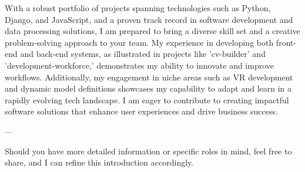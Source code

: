 
        With a robust portfolio of projects spanning technologies such as Python, Django, and JavaScript, and a proven track record in software development and data processing solutions, I am prepared to bring a diverse skill set and a creative problem-solving approach to your team.
         My experience in developing both front-end and back-end systems, as illustrated in projects like 'cv-builder' and 'development-workforce,' demonstrates my ability to innovate and improve workflows.
         Additionally, my engagement in niche areas such as VR development and dynamic model definitions showcases my capability to adapt and learn in a rapidly evolving tech landscape.
         I am eager to contribute to creating impactful software solutions that enhance user experiences and drive business success.


---

Should you have more detailed information or specific roles in mind, feel free to share, and I can refine this introduction accordingly.

